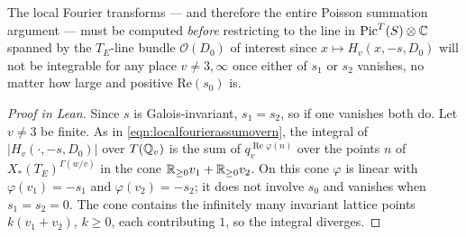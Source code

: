 \begin{remarknode}

\label{rem:localNonintegrability}


\leanok



 The local Fourier transforms --- and therefore the entire Poisson summation argument --- must be computed \emph{before} restricting to the line in $\mathrm{Pic}^T(S) \otimes \mathbb{C}$ spanned by the $T_E$-line bundle $\mathcal O(D_0)$ of interest since $x \mapsto H_v(x,-s,D_0)$ will not be integrable for any place $v \neq 3,\infty$ once either of $s_1$ or $s_2$ vanishes, no matter how large and positive $\mathrm{Re}(s_0)$ is. 

\end{remarknode}

\begin{proof}[Proof in Lean]

\leanok


Since $s$ is Galois-invariant, $s_1=s_2$, so if one vanishes both do. Let $v\neq3$ be finite. As in \eqref{eqn:localfourierassumovern}, the integral of $|H_v(\cdot,-s,D_0)|$ over $T(\mathbb{Q}_v)$ is the sum of $q_v^{\operatorname{Re}\varphi(n)}$ over the points $n$ of $X_\ast(T_E)^{\Gamma(w/v)}$ in the cone $\mathbb{R}_{\geq0}v_1+\mathbb{R}_{\geq0}v_2$. On this cone $\varphi$ is linear with $\varphi(v_1)=-s_1$ and $\varphi(v_2)=-s_2$; it does not involve $s_0$ and vanishes when $s_1=s_2=0$. The cone contains the infinitely many invariant lattice points $k(v_1+v_2)$, $k\geq0$, each contributing $1$, so the integral diverges.

\end{proof}

